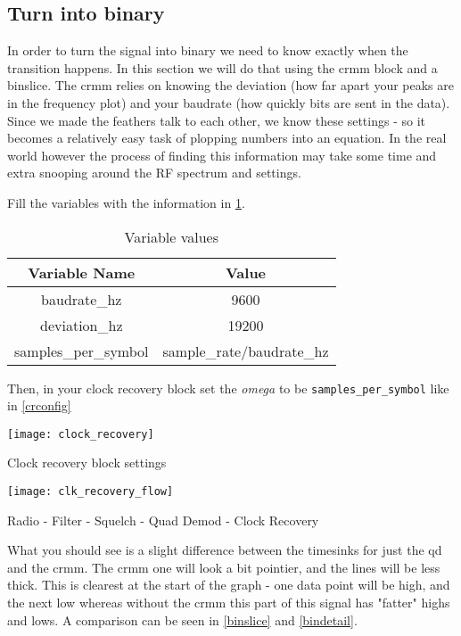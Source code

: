 \subsection{Turn into binary}

In order to turn the signal into binary we need to know exactly when the transition happens. In this section we will do that using the \Gls{crmm} block and a \Gls{binslice}. The \gls{crmm} relies on knowing the \gls{deviation} (how far apart your peaks are in the frequency plot) and your \gls{baudrate} (how quickly bits are sent in the data). Since we made the feathers talk to each other, we know these settings - so it becomes a relatively easy task of plopping numbers into an equation. In the real world however the process of finding this information may take some time and extra snooping around the \gls{RF} spectrum and settings. 


Fill the variables with the information in \cref{variablevalues}.

\begin{table}[H]
\begin{tabular}{|c|c|}
\hline
Variable Name & Value \\ \hline
baudrate\_hz & 9600 \\ \hline
deviation\_hz & 19200 \\ \hline
samples\_per\_symbol & sample\_rate/baudrate\_hz \\ \hline
\end{tabular}
\caption{Variable values}
\label{variablevalues}
\end{table}


Then, in your clock recovery block set the \textit{omega} to be \verb|samples_per_symbol| like in \cref{crconfig}

\centrefigurestart
\texttt{[image: clock\_recovery]}
\caption{Clock recovery block settings}
\label{crconfig}
\centrefigureend


\centrefigurestart
\texttt{[image: clk\_recovery\_flow]}
\caption{Radio - Filter - Squelch - Quad Demod - Clock Recovery}
\centrefigureend

What you should see is a slight difference between the \gls{timesink}s for just the \gls{qd} and the \gls{crmm}. The \gls{crmm} one will look a bit pointier, and the lines will be less thick. This is clearest at the start of the graph - one data point will be high, and the next low whereas without the \gls{crmm} this part of this signal has "fatter" highs and lows. A comparison can be seen in \cref{binslice} and \cref{bindetail}.

